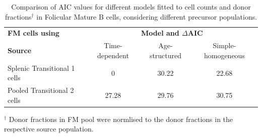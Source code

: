 \documentclass[11pt]{article}
\begin{document}
\begin{table}[h!]
	\begin{center}
		\renewcommand{\arraystretch}{1.25}
		\begin{tabular}{ l c c c } 
			\toprule 
			\multicolumn{1}{l}{\textbf{FM cells using}} & \multicolumn{3}{c}{\textbf{Model and $\Delta$AIC}} \\
			\cline{2-4}
			\textbf{Source}  &  {\small Time-dependent}  &  {\small Age-structured} & {\small Simple-homogeneous} \\ 
			\toprule
			Splenic Transitional 1 cells      & 0      &  30.22  & 22.68  \\ 
			Pooled Transitional 2 cells       & 27.28  &  29.76  & 30.75  \\
			\hline
			\toprule 
		\end{tabular}
	\end{center}
	\caption{\small Comparison of AIC values for different models fitted to cell counts and donor fractions$^{\dagger}$ in Folicular Mature B cells, considering different precursor populations.}
	$^{\dagger}$ \footnotesize{Donor fractions in FM pool were normlised to the donor fractions in the respective source population. }
	\label{tab:FM-AICs}
\end{table} 
\end{document}
